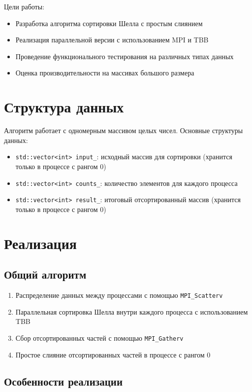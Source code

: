 \documentclass[12pt]{article}
\begin{document}
Цели работы:
\begin{itemize}
\item Разработка алгоритма сортировки Шелла с простым слиянием
\item Реализация параллельной версии с использованием MPI и TBB
\item Проведение функционального тестирования на различных типах данных
\item Оценка производительности на массивах большого размера
\end{itemize}

\section{Структура данных}
Алгоритм работает с одномерным массивом целых чисел. Основные структуры данных:
\begin{itemize}
\item \texttt{std::vector<int> input\_}: исходный массив для сортировки (хранится только в процессе с рангом 0)
\item \texttt{std::vector<int> counts\_}: количество элементов для каждого процесса
\item \texttt{std::vector<int> result\_}: итоговый отсортированный массив (хранится только в процессе с рангом 0)
\end{itemize}

\section{Реализация}
\subsection{Общий алгоритм}
\begin{enumerate}
\item Распределение данных между процессами с помощью \texttt{MPI_Scatterv}
\item Параллельная сортировка Шелла внутри каждого процесса с использованием TBB
\item Сбор отсортированных частей с помощью \texttt{MPI_Gatherv}
\item Простое слияние отсортированных частей в процессе с рангом 0
\end{enumerate}

\subsection{Особенности реализации}
\end{document}
